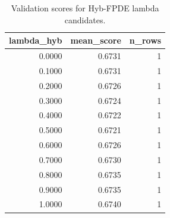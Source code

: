 \begin{table}[t]
\caption{Validation scores for Hyb-FPDE lambda candidates.}
\label{tab:lambda_distribution_computed}
\centering
\begin{tabular}{rrr}
\toprule
lambda\_hyb & mean\_score & n\_rows \\
\midrule
0.0000 & 0.6731 & 1 \\
0.1000 & 0.6731 & 1 \\
0.2000 & 0.6726 & 1 \\
0.3000 & 0.6724 & 1 \\
0.4000 & 0.6722 & 1 \\
0.5000 & 0.6721 & 1 \\
0.6000 & 0.6726 & 1 \\
0.7000 & 0.6730 & 1 \\
0.8000 & 0.6735 & 1 \\
0.9000 & 0.6735 & 1 \\
1.0000 & 0.6740 & 1 \\
\bottomrule
\end{tabular}

\end{table}

